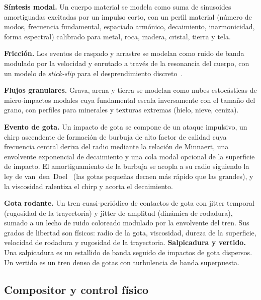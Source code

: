 \documentclass[a4paper,11pt,twoside]{article}
\begin{document}
\textbf{Síntesis modal.} Un cuerpo material se modela como suma de sinusoides amortiguadas excitadas por un impulso corto, con un perfil material (número de modos, frecuencia fundamental, espaciado armónico, decaimiento, inarmonicidad, forma espectral) calibrado para metal, roca, madera, cristal, tierra y tela.

\textbf{Fricción.} Los eventos de raspado y arrastre se modelan como ruido de banda modulado por la velocidad y enrutado a través de la resonancia del cuerpo, con un modelo de \emph{stick-slip} para el desprendimiento discreto~\cite{avanzini2005friction}.

\textbf{Flujos granulares.} Grava, arena y tierra se modelan como nubes estocásticas de micro-impactos modales cuya fundamental escala inversamente con el tamaño del grano, con perfiles para minerales y texturas extremas (hielo, nieve, ceniza).

\textbf{Evento de gota.} Un impacto de gota se compone de un ataque impulsivo, un chirp ascendente de formación de burbuja de alto factor de calidad cuya frecuencia central deriva del radio mediante la relación de Minnaert, una envolvente exponencial de decaimiento y una cola modal opcional de la superficie de impacto. El amortiguamiento de la burbuja se acopla a su radio siguiendo la ley de van~den~Doel~\cite{vandendoel2005physically} (las gotas pequeñas decaen más rápido que las grandes), y la viscosidad ralentiza el chirp y acorta el decaimiento.

\textbf{Gota rodante.} Un tren cuasi-periódico de contactos de gota con jitter temporal (rugosidad de la trayectoria) y jitter de amplitud (dinámica de rodadura), sumado a un lecho de ruido coloreado modulado por la envolvente del tren. Sus grados de libertad son físicos: radio de la gota, viscosidad, dureza de la superficie, velocidad de rodadura y rugosidad de la trayectoria. \textbf{Salpicadura y vertido.} Una salpicadura es un estallido de banda seguido de impactos de gota dispersos. Un vertido es un tren denso de gotas con turbulencia de banda superpuesta.

\subsection{Compositor y control físico}
\label{sec:compositor}
\end{document}
